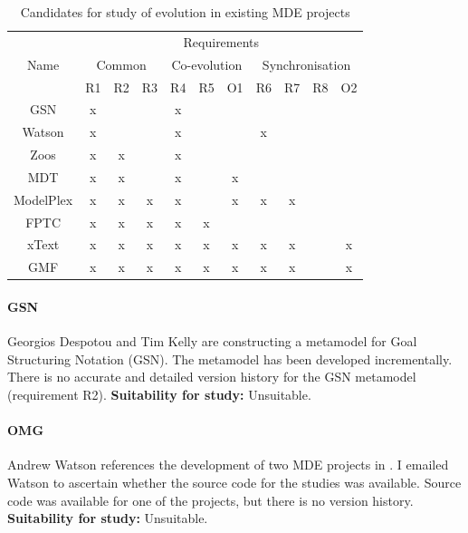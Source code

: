 \begin{table}
	\caption{Candidates for study of evolution in existing MDE projects}
	\centering
	\begin{tabular}{|c||c|c|c||c|c|c||c|c|c|c|}
		\hline
		\multirow{3}{*}{Name} & \multicolumn{10}{|c|}{Requirements} \\
		\cline{2-11}
		          & \multicolumn{3}{|c||}{Common} & \multicolumn{3}{|c||}{Co-evolution} & \multicolumn{4}{|c|}{Synchronisation} \\
		\cline{2-11}
		          & R1 & R2 & R3 & R4 & R5 & O1 & R6 & R7 & R8 & O2 \\
		\hline
		GSN       & x  &    &    & x  &    &    &    &    &    &    \\
		\hline
		Watson    & x  &    &    & x  &    &    & x  &    &    &    \\
		\hline
		Zoos      & x  & x  &    & x  &    &    &    &    &    &    \\
		\hline
		MDT       & x  & x  &    & x  &    & x  &    &    &    &    \\
		\hline
		ModelPlex & x  & x  & x  & x  &    & x  & x  & x  &    &    \\
		\hline
		FPTC      & x  & x  & x  & x  & x  &    &    &    &    &    \\
		\hline
		xText     & x  & x  & x  & x  & x  & x  & x  & x  &    & x  \\
		\hline
		GMF       & x  & x  & x  & x  & x  & x  & x  & x  &    & x  \\
		\hline
	\end{tabular}
	\label{tab:candidates}
\end{table}

\paragraph{GSN} %
\label{par:gsn}
Georgios Despotou and Tim Kelly are constructing a metamodel for Goal Structuring Notation (GSN). The metamodel has been developed incrementally. There is no accurate and detailed version history for the GSN metamodel (requirement R2). \textbf{Suitability for study:} Unsuitable.

\paragraph{OMG} %
\label{par:omg}
Andrew Watson references the development of two MDE projects in \cite{watson08mdahistory}. I emailed Watson to ascertain whether the source code for the studies was available. Source code was available for one of the projects, but there is no version history. \textbf{Suitability for study:} Unsuitable.


